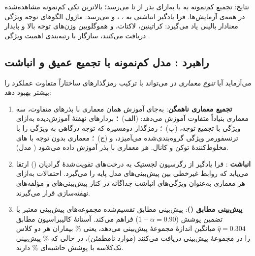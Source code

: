 نتایج: تجمیع کم‌نمونه  به  \textbf{} \cnum{[0.669, 0.772]} با  به‌ازای بذر از  تا \textbf{} می‌رسد؛ بالاترین  تکی کم‌نمونه مشاهده‌شده در همه‌ی آزمایش‌ها. فرا یادگیر انباشتی  به  \textbf{} \cnum{[0.680, 0.778]}،  ، و   می‌رسد. ماژول  الگوهای توجه ویژگی معنادار بالینی یاد می‌گیرد: کراتینین، لاکتات، و هموگلوبین وزن‌های توجه بالا و پایدار دریافت می‌کنند، سازگار با رتبه‌بندی اهمیت ویژگی .

\subsection{راهبرد : مدل کم‌نمونه  با تجمیع عمیق و انباشت }
\label{sec:v6-strategy}

 می‌آزماید آیا \emph{تنوع معماری} در  می‌تواند با ترکیب رمزگذارهای ساختاراً متفاوت عملکرد را بیشتر بهبود دهد:

\begin{enumerate}
\item \textbf{تجمیع معماری ناهمگن}: به‌جای آموزش همان معماری با بذرهای متفاوت،  سه معماری بنیاداً متفاوت آموزش می‌دهد: (الف)~\textbf{}؛ بردارهای نهفتۀ آموزش‌دیده به‌ازای ویژگی با تجمیع توجه، (ب)~\textbf{}؛ رمزگذار دومسیره که توجه درگاهی به ویژگی را با ترنسفورمر ویژگی گروه‌بندی‌شده می‌آمیزد، و (ج)~\textbf{}؛ معماری بدون توجه با های مخلوط‌کنندۀ توکن و کانال. هر معماری با  بذر آموزش داده می‌شود ( مدل).

\item \textbf{انباشت }: فرا یادگیر از رگرسیون لجستیک به درخت‌های تقویت‌شدۀ گرادیان () ارتقا می‌یابد که روابط غیرخطی بین پیش‌بینی‌های مدل پایه را می‌گیرد. احتمالات  به‌ازای هر معماری به‌عنوان ویژگی‌های انباشت جداگانه در کنار پیش‌بینی‌های  و مؤلفه‌های  نهفته‌سازی قرار می‌گیرند.

\item \textbf{پیش‌بینی مطابق ()}: پیش‌بینی مطابق تقسیم‌شده مجموعه‌های پیش‌بینی معتبر با تضمین پوشش ($1 - \alpha = 0.90$) فراهم می‌کند. آستانۀ کالیبراسیون مطابق $\hat{q} = 0.304$ میانگین اندازۀ مجموعۀ پیش‌بینی  می‌دهد، یعنی \% بیماران هر دو کلاس را در مجموعۀ پیش‌بینی دریافت می‌کنند (موارد نامطمئن)، در حالی که \% پیش‌بینی تک‌کلاسه با پوشش حاشیه‌ای \% دارند.
\end{enumerate}

